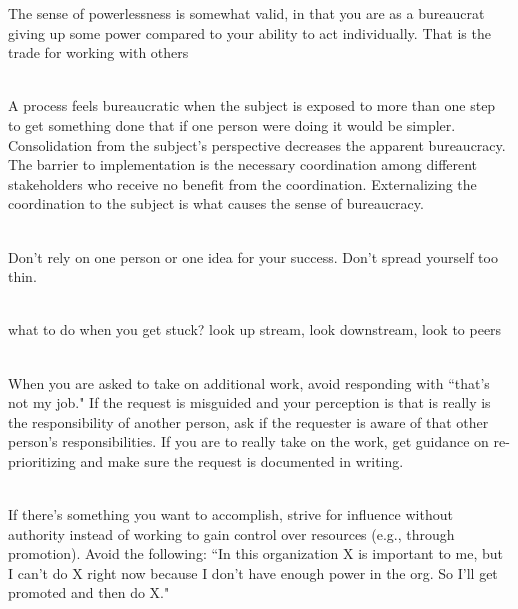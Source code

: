 The sense of powerlessness is somewhat valid, in that you are as a bureaucrat giving up some power compared to your ability to act individually. That is the trade for working with others

\ \\

A process feels bureaucratic when the subject is exposed to more than one step to get something done that if one person were doing it would be simpler. Consolidation from the subject's perspective decreases the apparent bureaucracy. The barrier to implementation is the necessary coordination among different stakeholders who receive no benefit from the coordination. Externalizing the coordination to the subject is what causes the sense of bureaucracy. 


\ \\

Don't rely on one person or one idea for your success. Don't spread yourself too thin. 

\ \\

what to do when you get stuck?
look up stream, look downstream, look to peers

\ \\

When you are asked to take on additional work, avoid responding with ``that's not my job." If the request is misguided and your perception is that is really is the responsibility of another person, ask if the requester is aware of that other person's responsibilities. If you are to really take on the work, get guidance on re-prioritizing and make sure the request is documented in writing. 

\ \\

If there's something you want to accomplish, strive for influence without authority instead of working to gain control over resources (e.g., through promotion). Avoid the following: ``In this organization X is important to me, but I can't do X right now because I don't have enough power in the org. So I'll get promoted and then do X."

\ \\

